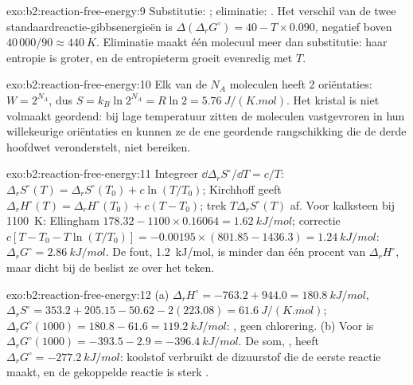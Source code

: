 \begin{solution}{exo:b2:reaction-free-energy:9}
Substitutie: ; eliminatie:
. Het verschil van de twee
standaardreactie-gibbsenergieën is $\Delta(\Delta_r G^\circ) = 40 - T \times
0.090$, negatief boven $40\,000/90 \approx \qty{440}{K}$. Eliminatie maakt
één molecuul meer dan substitutie: haar entropie is groter, en de entropieterm
groeit evenredig met $T$.
\end{solution}

\begin{solution}{exo:b2:reaction-free-energy:10}
Elk van de $N_A$ moleculen heeft 2 oriëntaties: $W = 2^{N_A}$, dus $S =
k_B\ln 2^{N_A} = R\ln 2 = \qty{5.76}{J/(K.mol)}$. Het kristal is niet
volmaakt geordend: bij lage temperatuur zitten de moleculen vastgevroren in hun
willekeurige oriëntaties en kunnen ze de ene geordende rangschikking die de derde
hoofdwet veronderstelt, niet bereiken.
\end{solution}

\begin{solution}{exo:b2:reaction-free-energy:11}
Integreer $\dd\Delta_r S^\circ/\dd T = c/T$: $\Delta_r S^\circ(T) = \Delta_r
S^\circ(T_0) + c\ln(T/T_0)$; Kirchhoff geeft $\Delta_r H^\circ(T) = \Delta_r
H^\circ(T_0) + c(T - T_0)$; trek $T\Delta_r S^\circ(T)$ af. Voor kalksteen bij
\qty{1100}{K}: Ellingham $178.32 - 1100 \times 0.16064 = \qty{1.62}{kJ/mol}$;
correctie $c[T - T_0 - T\ln(T/T_0)] = -0.00195 \times (801.85 - 1436.3) =
\qty{+1.24}{kJ/mol}$: $\Delta_r G^\circ = \qty{2.86}{kJ/mol}$. De fout,
\qty{1.2}{kJ/mol}, is minder dan één procent van $\Delta_r H^\circ$, maar dicht bij
de  beslist ze over het teken.
\end{solution}

\begin{solution}{exo:b2:reaction-free-energy:12}
(a) $\Delta_r H^\circ = -763.2 + 944.0 = \qty{+180.8}{kJ/mol}$, $\Delta_r
S^\circ = 353.2 + 205.15 - 50.62 - 2(223.08) = \qty{+61.6}{J/(K.mol)}$;
$\Delta_r G^\circ(1000) = 180.8 - 61.6 = \qty{+119.2}{kJ/mol}$: ,
geen chlorering. (b) Voor  is $\Delta_r G^\circ(1000) =
-393.5 - 2.9 = \qty{-396.4}{kJ/mol}$. De som, , heeft $\Delta_r G^\circ = \qty{-277.2}{kJ/mol}$: koolstof
verbruikt de dizuurstof die de eerste reactie maakt, en de gekoppelde reactie is
sterk .
\end{solution}

